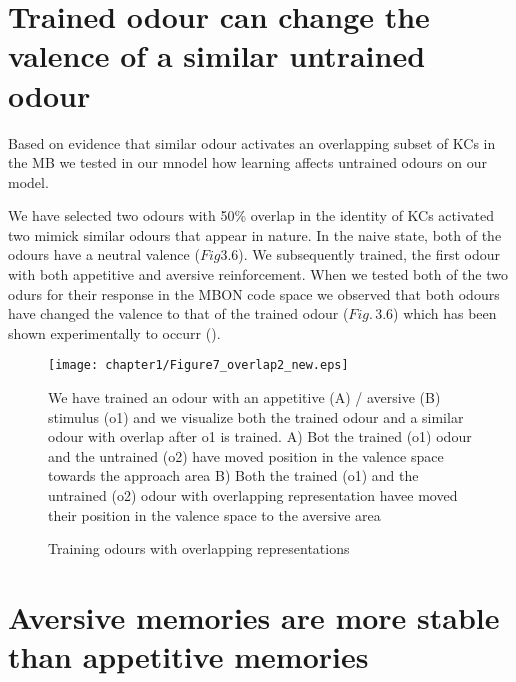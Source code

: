 \section{Trained odour can change the valence of a similar untrained odour }

Based on evidence that similar odour activates an overlapping subset
of KCs in the MB we tested in our mnodel how learning affects untrained
odours on our model. 

We have selected two odours with 50\% overlap in the identity of KCs
activated two mimick similar odours that appear in nature. In the
naive state, both of the odours have a neutral valence ($Fig3.6$).
We subsequently trained, the first odour with both appetitive and
aversive reinforcement. When we tested both of the two odurs for their
response in the MBON code space we observed that both odours have
changed the valence to that of the trained odour ($Fig.\,3.6$) which
has been shown experimentally to occurr (\citealp{Campbell:2013fba}). 

\begin{figure}[H]
%
\texttt{[image: chapter1/Figure7\_overlap2\_new.eps]} {\caption[text to list
 of figures]{%
Training odours with overlapping representations%
}
}We have trained an odour with an appetitive (A) / aversive (B) stimulus
(o1) and we visualize both the trained odour and a similar odour with
overlap after o1 is trained. A) Bot the trained (o1) odour and the
untrained (o2) have moved position in the valence space towards the
approach area B) Both the trained (o1) and the untrained (o2) odour
with overlapping representation havee moved their position in the
valence space to the aversive area%
\end{figure}

\section{Aversive memories are more stable than appetitive memories}

